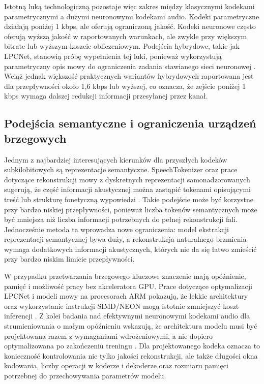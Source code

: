 Istotną luką technologiczną pozostaje więc zakres między klasycznymi kodekami parametrycznymi a dużymi neuronowymi kodekami audio. Kodeki parametryczne działają poniżej 1 kbps, ale oferują ograniczoną jakość. Kodeki neuronowe często oferują wyższą jakość w raportowanych warunkach, ale zwykle przy większym bitrate lub wyższym koszcie obliczeniowym. Podejścia hybrydowe, takie jak LPCNet, stanowią próbę wypełnienia tej luki, ponieważ wykorzystują parametryczny opis mowy do ograniczenia zadania stawianego sieci neuronowej \cite{Valin2019LPCNet,Zhu2021OptimizingLPCNet}. Wciąż jednak większość praktycznych wariantów hybrydowych raportowana jest dla przepływności około 1{,}6 kbps lub wyższej, co oznacza, że zejście poniżej 1 kbps wymaga dalszej redukcji informacji przesyłanej przez kanał.

\subsection{Podejścia semantyczne i ograniczenia urządzeń brzegowych}
\label{subsec:podejscia-semantyczne-edge}

Jednym z najbardziej interesujących kierunków dla przyszłych kodeków subkilobitowych są reprezentacje semantyczne. SpeechTokenizer oraz prace dotyczące rekonstrukcji mowy z dyskretnych reprezentacji samonadzorowanych sugerują, że część informacji akustycznej można zastąpić tokenami opisującymi treść lub strukturę fonetyczną wypowiedzi \cite{Zhang2023SpeechTokenizer,Polyak2021SpeechResynthesis}. Takie podejście może być korzystne przy bardzo niskiej przepływności, ponieważ liczba tokenów semantycznych może być mniejsza niż liczba informacji potrzebnych do pełnej rekonstrukcji fali. Jednocześnie metoda ta wprowadza nowe ograniczenia: model ekstrakcji reprezentacji semantycznej bywa duży, a rekonstrukcja naturalnego brzmienia wymaga dodatkowych informacji akustycznych, których nie da się łatwo zmieścić przy bardzo niskim limicie przepływności.

W przypadku przetwarzania brzegowego kluczowe znaczenie mają opóźnienie, pamięć i możliwość pracy bez akceleratora GPU. Prace dotyczące optymalizacji LPCNet i modeli mowy na procesorach ARM pokazują, że lekkie architektury oraz wykorzystanie instrukcji SIMD/NEON mogą istotnie zmniejszyć koszt inferencji \cite{Valin2022UltraLowLatencySpeechEnhancement,Zhu2021OptimizingLPCNet}. Z kolei badania nad efektywnymi neuronowymi kodekami audio dla strumieniowania o małym opóźnieniu wskazują, że architektura modelu musi być projektowana razem z wymaganiami wdrożeniowymi, a nie dopiero optymalizowana po zakończeniu treningu \cite{Morrison2022EfficientNeuralAudioCodecs}. Dla projektowanego kodeka oznacza to konieczność kontrolowania nie tylko jakości rekonstrukcji, ale także długości okna kodowania, liczby operacji w koderze i dekoderze oraz rozmiaru pamięci potrzebnej do przechowywania parametrów modelu.

